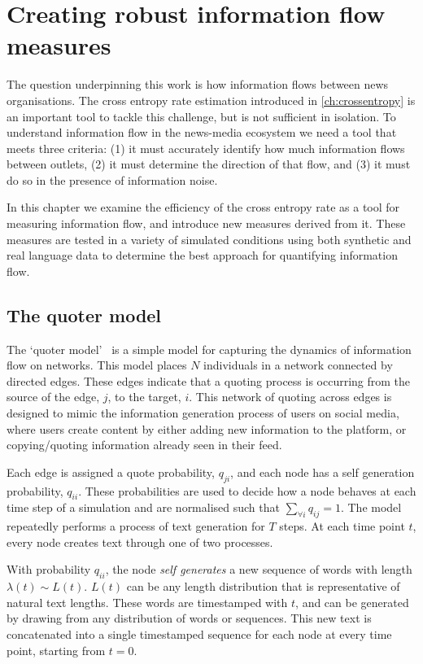 \chapter{Creating robust information flow measures}\label{ch:quotermodel}

The question underpinning this work is how information flows between news organisations. The cross entropy rate estimation introduced in \autoref{ch:crossentropy} is an important tool to tackle this challenge, but is not sufficient in isolation. To understand information flow in the news-media ecosystem we need a tool that meets three criteria: (1) it must accurately identify how much information flows between outlets, (2) it must determine the direction of that flow, and (3) it must do so in the presence of information noise.

In this chapter we examine the efficiency of the cross entropy rate as a tool for measuring information flow, and introduce new measures derived from it. These measures are tested in a variety of simulated conditions using both synthetic and real language data to determine the best approach for quantifying information flow.


\section{The quoter model}
The `quoter model'~\cite{bagrow_quoter_2018} is a simple model for capturing the dynamics of information flow on networks. This model places $N$ individuals in a network connected by directed edges. These edges indicate that a quoting process is occurring from the source of the edge, $j$, to the target, $i$. This network of quoting across edges is designed to mimic the information generation process of users on social media, where users create content by either adding new information to the platform, or copying/quoting information already seen in their feed.

Each edge is assigned a quote probability, $q_{ji}$, and each node has a self generation probability, $q_{ii}$. These probabilities are used to decide how a node behaves at each time step of a simulation and are normalised such that $\sum_{\forall i} q_{ij} = 1$. The model repeatedly performs a process of text generation for $T$ steps. At each time point $t$, every node creates text through one of two processes.

With probability $q_{ii}$, the node \emph{self generates} a new sequence of words with length $\lambda(t) \sim L(t)$. $L(t)$ can be any length distribution that is representative of natural text lengths. These words are timestamped with $t$, and can be generated by drawing from any distribution of words or sequences. This new text is concatenated into a single timestamped sequence for each node at every time point, starting from $t=0$.

